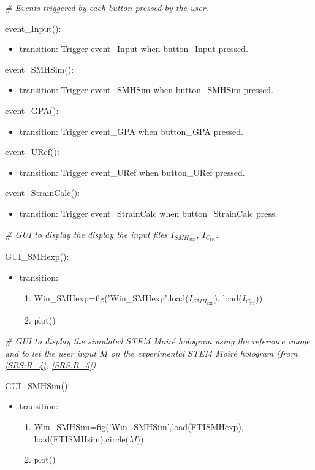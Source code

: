 \documentclass[12pt, titlepage]{article}
\begin{document}
\noindent\textit{{\#} Events triggered by each button pressed by the 
user.}\medskip

\noindent event{\_}Input():
\begin{itemize}
\item transition: Trigger event{\_}Input when button{\_}Input pressed.
\end{itemize}
\bigskip
\noindent event{\_}SMHSim():
\begin{itemize}
\item transition: Trigger event{\_}SMHSim when button{\_}SMHSim pressed.
\end{itemize}
\bigskip
\noindent event{\_}GPA():
\begin{itemize}
\item transition: Trigger event{\_}GPA when button{\_}GPA pressed.
\end{itemize}
\bigskip
\noindent event{\_}URef():
\begin{itemize}
\item transition: Trigger event{\_}URef when button{\_}URef pressed.
\end{itemize}
\bigskip
\noindent event{\_}StrainCalc():
\begin{itemize}
\item transition: Trigger event{\_}StrainCalc when button{\_}StrainCalc press.
\end{itemize}
\bigskip

\noindent\textit{{\#} GUI to display the display the input files 
$I_{\mathit{SMH}_{\text{exp}}}$, $I_{C_{\text{ref}}}$.}\medskip

\noindent GUI{\_}SMHexp():
\begin{itemize}
\item transition: 
	\begin{enumerate}
	\item Win{\_}SMHexp=fig('Win{\_}SMHexp',load($I_{\mathit{SMH}_{\text{exp}}}$), 
load($I_{C_{\text{ref}}}$))
	\item plot()
	\end{enumerate} 
\end{itemize}
\bigskip


\noindent\textit{{\#} GUI to display the simulated STEM Moir{\'e} hologram using 
the reference image and to let the user input $M$ on the experimental STEM 
Moir{\'e} hologram (from \cref{SRS:R_4}, \cref{SRS:R_5}).}\medskip

\noindent GUI{\_}SMHSim():
\begin{itemize}
\item transition: 
	\begin{enumerate}
	\item 
Win{\_}SMHSim=fig('Win{\_}SMHSim',load(FTISMHexp), \\ 
load(FTISMHsim),circle($M$))
	\item plot()
	\end{enumerate} 
\end{itemize}
\bigskip
\end{document}
